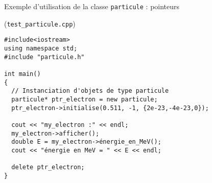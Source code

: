 \documentclass[c]{beamer}
\begin{document}

\begin{frame}[fragile,label={sec:orgheadline7}]{Exemple d'utilisation de la classe \texttt{particule} : pointeurs}
  \begin{cbox}[][lwuc](\texttt{test\_particule.cpp})
 \begin{verbatim}
#include<iostream>
using namespace std;
#include "particule.h"

int main()
{
  // Instanciation d'objets de type particule
  particule* ptr_electron = new particule;
  ptr_electron->initialise(0.511, -1, {2e-23,-4e-23,0});

  cout << "my_electron :" << endl;
  my_electron->afficher();
  double E = my_electron->énergie_en_MeV();
  cout << "énergie en MeV = " << E << endl;
 
  delete ptr_electron;
}
 \end{verbatim}
 \end{cbox}
\end{frame}
\end{document}

